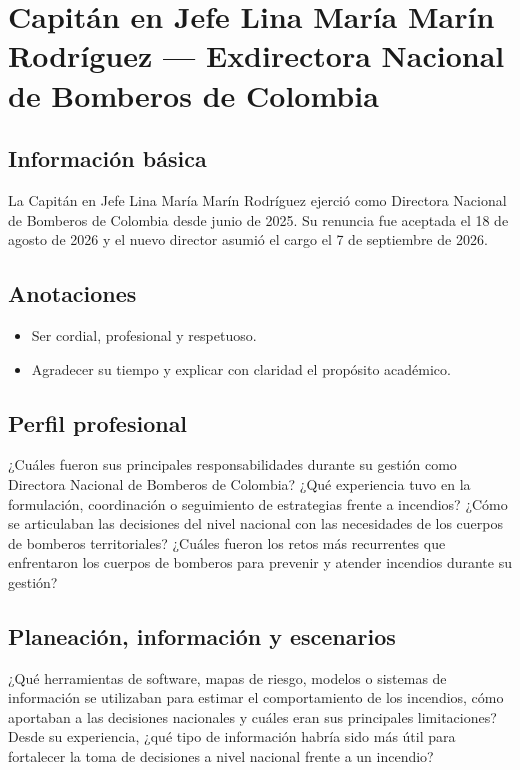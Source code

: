 \section{Capitán en Jefe Lina María Marín Rodríguez --- Exdirectora Nacional de Bomberos de Colombia}

\subsection{Información básica}
La Capitán en Jefe Lina María Marín Rodríguez ejerció como Directora Nacional de Bomberos de Colombia desde junio de 2025. Su renuncia fue aceptada el 18 de agosto de 2026 y el nuevo director asumió el cargo el 7 de septiembre de 2026.

\subsection{Anotaciones}
\begin{itemize}
  \item Ser cordial, profesional y respetuoso.
  \item Agradecer su tiempo y explicar con claridad el propósito académico.
\end{itemize}

\subsection{Perfil profesional}
\begin{enumerate}
  \pregunta ¿Cuáles fueron sus principales responsabilidades durante su gestión como Directora Nacional de Bomberos de Colombia?
  \pregunta ¿Qué experiencia tuvo en la formulación, coordinación o seguimiento de estrategias frente a incendios?
  \pregunta ¿Cómo se articulaban las decisiones del nivel nacional con las necesidades de los cuerpos de bomberos territoriales?
  \pregunta ¿Cuáles fueron los retos más recurrentes que enfrentaron los cuerpos de bomberos para prevenir y atender incendios durante su gestión?
\end{enumerate}

\subsection{Planeación, información y escenarios}
\begin{enumerate}
  \pregunta ¿Qué herramientas de software, mapas de riesgo, modelos o sistemas de información se utilizaban para estimar el comportamiento de los incendios, cómo aportaban a las decisiones nacionales y cuáles eran sus principales limitaciones?
  \pregunta Desde su experiencia, ¿qué tipo de información habría sido más útil para fortalecer la toma de decisiones a nivel nacional frente a un incendio?
\end{enumerate}


